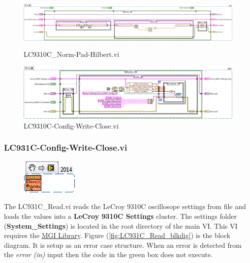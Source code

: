 \documentclass[11pt,a4paper,oldfontcommands]{memoir}
\begin{document}
\begin{figure}
	\includegraphics[width=\textheight,keepaspectratio]{LC931C_norm-pad-hilbert_blockdiagram_01}
	\caption{LC9310C\_Norm-Pad-Hilbert.vi}
	\label{fig:LC9310C_norm-pad-hilber_blkdig}
	\vspace{2cm}
	\includegraphics[width=\textheight,keepaspectratio]{LC931C-Config-Write-Close_blockdiagram_01}
	\caption{LC9310C-Config-Write-Close.vi}
	\label{fig:LC9310C-Config-Write-Closet_blkdig}
\end{figure}

\subsubsection{LC931C-Config-Write-Close.vi} \label{LC9310C_cwc}
\noindent\hrulefill

\begin{figure}[H]
	\includegraphics[scale=0.625]{LC931C-Config-Write-Close_main_01}
	\label{fig:LC9310C-Config-Write-Close_main_01}
\end{figure}

The LC931C\_Read.vi reads the LeCroy 9310C oscillosope settings from file and loads the values into a \textbf{LeCroy 9310C Settings} cluster. The settings folder (\textbf{System\_Settings}) is located in the root directory of the main VI. This VI requires the \href{http://sine.ni.com/nips/cds/view/p/lang/en/nid/209753}{MGI Library}. Figure (\ref{fig:LC931C_Read_blkdig}) is the block diagram.  It is setup as an error case structure. When an error is detected from the \textit{error (in)} input then the code in the green box does not execute.
\end{document}
